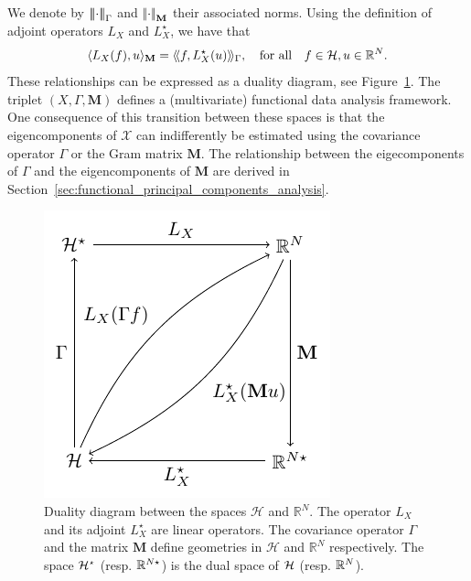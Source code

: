 {\begin{equation}
\end{equation}
We denote by $\left|\!\left|\!\left|\cdot\right|\!\right|\!\right|_\Gamma$ and $\left|\!\left|\cdot\right|\!\right|_{\mathbf{M}}$ their associated norms.
Using the definition of adjoint operators $L_X$ and $L^\star_X$, we have that
\begin{equation}
    \langle L_X(f), u\rangle_{\mathbf{M}} = \langle\!\langle f, L^\star_X(u)\rangle\!\rangle_\Gamma, \quad\text{for all}\quad f \in \mathcal{H}, u \in \mathbb{R}^N.
\end{equation}
These relationships can be expressed as a duality diagram, see Figure~\ref{fig:duality_diagram}. The triplet $(X, \Gamma, \mathbf{M})$ defines a (multivariate) functional data analysis framework. One consequence of this transition between these spaces is that the eigencomponents of $\mathcal{X}$ can indifferently be estimated using the covariance operator $\Gamma$ or the Gram matrix $\mathbf{M}$.} The relationship between the eigecomponents of $\Gamma$ and the eigencomponents of $\mathbf{M}$ are derived in Section~\ref{sec:functional_principal_components_analysis}.
\begin{figure}
    \centering
    \includegraphics[scale=1.2]{figures/duality_diagram.pdf}
    \caption{Duality diagram between the spaces $\mathcal{H}$ and $\mathbb{R}^N$. The operator $L_X$ and its adjoint $L^\star_X$ are linear operators. The covariance operator $\Gamma$ and the matrix $\mathbf{M}$ define geometries in $\mathcal{H}$ and $\mathbb{R}^N$ respectively. The space $\mathcal{H}^\star$ (resp. $\mathbb{R}^{N \star}$) is the dual space of $\mathcal{H}$ (resp. $\mathbb{R}^N$).}
    \label{fig:duality_diagram}
\end{figure}

\begin{remark}\label{rem:rhks}
\end{remark}

